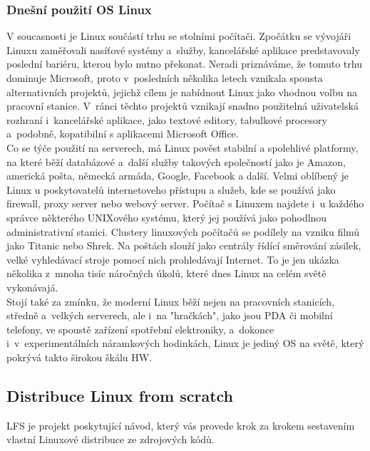 \documentclass[a4paper,12pt]{article}
\begin{document}
\subsubsection{Dnešní použití OS Linux}
V soucasnosti je Linux součástí trhu se stolními počítači. Zpočátku se vývojáři Linuxu zaměřovali nasíťové systémy a~služby, kancelářské aplikace predstavovaly poslední bariéru, kterou bylo nutno překonat. Neradi priznáváme, že tomuto trhu dominuje Microsoft, proto v~posledních několika letech vznikala spousta alternativních projektů, jejichž cílem je nabídnout Linux jako vhodnou volbu na pracovní stanice. V~ránci těchto projektů vznikají snadno použitelná uživatelská rozhraní i~kancelářské aplikace, jako textové editory, tabulkové procesory a~podobně, kopatibilní s aplikacemi Microsoft Office.\\
Co se týče použití na serverech, má Linux pověst stabilní a spolehlivé platformy, na které běží databázové a~další služby takových společností jako je Amazon, americká pošta, německá armáda, Google, Facebook a další. Velmi oblíbený je Linux u poskytovatelů internetoveho přístupu a služeb, kde se používá jako firewall, proxy server nebo webový server. Počítač s Linuxem najdete i~u každého správce některého UNIXového systému, který jej používá jako pohodlnou administrativní stanici. Clustery linuxových počítačů se podílely na vzniku filmů jako Titanic nebo Shrek. Na poštách slouží jako centrály řídící směrování zásilek, velké vyhledávací stroje pomocí nich prohledávají Internet. To je jen ukázka několika z~mnoha tisíc náročných úkolů, které dnes Linux na celém světě vykonávajá.\\
Stojí také za zmínku, že moderní Linux běží nejen na pracovních stanicích, středně a~velkých serverech, ale i~na "hračkách", jako jsou PDA či mobilní telefony, ve spoustě zařízení spotřební elektroniky, a~dokonce i~v~experimentálních náramkových hodinkách, Linux je jediný OS na světě, který pokrývá takto širokou škálu HW.~\cite{LDP}
\subsection{Distribuce Linux from scratch}
LFS je projekt poskytující návod, který vás provede krok za krokem sestavením vlastní Linuxové distribuce ze zdrojových kódů.~\cite{LFSwMAIN}
\end{document}
